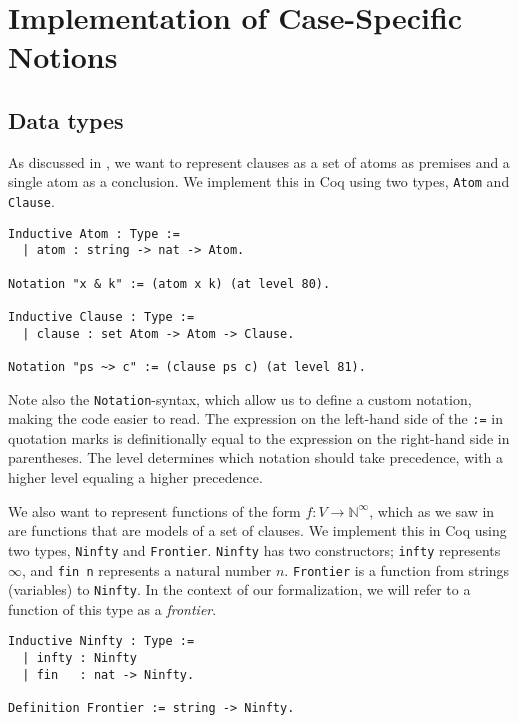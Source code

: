 \chapter{Implementation of Case-Specific Notions}
\label{chap:implementation}

\section{Data types}

As discussed in , we want to represent clauses as
a set of atoms as premises and a single atom as a conclusion.
We implement this in Coq using two types, \lstinline{Atom} and \lstinline{Clause}.

\begin{minipage}{\linewidth}
\begin{lstlisting}[language=Coq, label={lst:atom_clause_def}, caption={\lstinline{Atom} and \lstinline{Clause} in Coq}]
Inductive Atom : Type :=
  | atom : string -> nat -> Atom.

Notation "x & k" := (atom x k) (at level 80).

Inductive Clause : Type :=
  | clause : set Atom -> Atom -> Clause.

Notation "ps ~> c" := (clause ps c) (at level 81).
\end{lstlisting}
\end{minipage}

Note also the \lstinline{Notation}-syntax, which allow us to define a custom notation,
making the code easier to read. The expression on the left-hand side of the \lstinline{:=} in quotation marks
is definitionally equal to the expression on the right-hand side in parentheses.
The level determines which notation should take precedence, with a higher level equaling a higher precedence.

We also want to represent functions of the form $f : V \rightarrow \mathbb{N}^{\infty}$,
which as we saw in 
are functions that are models of a set of clauses.
We implement this in Coq using two types, \lstinline{Ninfty} and \lstinline{Frontier}.
\lstinline{Ninfty} has two constructors; \lstinline{infty} represents $\infty$,
and \lstinline{fin n} represents a natural number $n$.
\lstinline{Frontier} is a function from strings (variables) to \lstinline{Ninfty}.
In the context of our formalization, we will refer to a function of this
type as a \emph{frontier}.

\begin{minipage}{\linewidth}
\begin{lstlisting}[language=Coq, label={lst:ninfty_frontier_def}, caption={\lstinline{Ninfty} and \lstinline{Frontier} in Coq}]
Inductive Ninfty : Type :=
  | infty : Ninfty
  | fin   : nat -> Ninfty.

Definition Frontier := string -> Ninfty.
\end{lstlisting}
\end{minipage}

